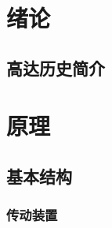 \documentclass{njuthesis}
\begin{document}
\maketitle
\chapter{绪论}
    \section{高达历史简介}
\chapter{原理}
    \section{基本结构}
    \subsection{传动装置}
\end{document}

